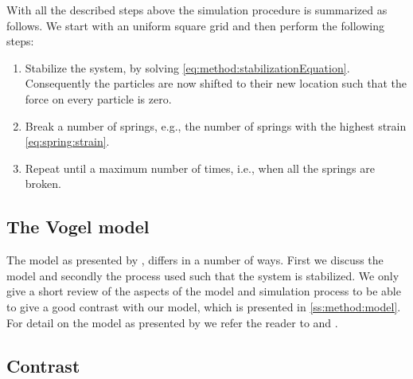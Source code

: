 With all the described steps above the simulation procedure is summarized as follows. We start with an uniform square grid and then perform the following steps:
\begin{enumerate}
	\item Stabilize the system, by solving \eqref{eq:method:stabilizationEquation}. Consequently the particles are now shifted to their new location such that the force on every particle is zero.
	\item Break a number of springs, e.g., the number of springs with the highest strain \eqref{eq:spring:strain}.
	\item Repeat until a maximum number of times, i.e., when all the springs are broken.
\end{enumerate}

\subsection{The Vogel model}\label{ss:method:vogel}


The model as presented by \citeauthor{vogel2005studies2} \cite{vogel2005studies2}, differs in a number of ways. First we discuss the model and secondly the process used such that the system is stabilized. We only give a short review of the aspects of the model and simulation process to be able to give a good contrast with our model, which is presented in \cref{ss:method:model}. For detail on the model as presented by \citeauthor{vogel2005studies2} we refer the reader to \cite{vogel2005studies1} and \cite{vogel2005studies2}.




\subsection{Contrast}\label{ss:method:contrast}




